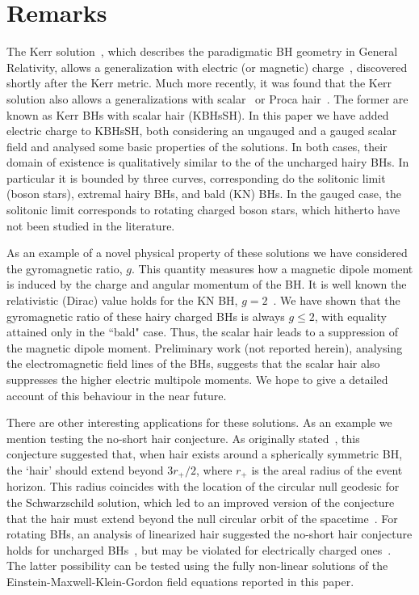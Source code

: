 \documentclass{article}
\begin{document}
\section{Remarks}
\label{sec_remarks}

The Kerr solution~\cite{Kerr:1963ud}, which describes the paradigmatic BH geometry in General Relativity, allows a generalization with electric (or magnetic) charge~\cite{Newman:1965my}, discovered shortly after the Kerr metric. Much more recently, it was found that the Kerr solution also allows a generalizations with scalar~\cite{Herdeiro:2014goa,Herdeiro:2015gia,Kleihaus:2015iea,Herdeiro:2015tia,Chodosh:2015oma} or Proca hair~\cite{Herdeiro:2016tmi}. The former are known as Kerr BHs with scalar hair (KBHsSH). In this paper we have added electric charge to KBHsSH, both considering an ungauged and a gauged scalar field and analysed some basic properties of the solutions. In both cases, their domain of existence is qualitatively similar to the of the uncharged hairy BHs. In particular it is bounded by three curves, corresponding do the solitonic limit (boson stars), extremal hairy BHs, and bald (KN) BHs. In the gauged case, the solitonic limit corresponds to rotating charged boson stars, which hitherto have not been studied in the literature. 

As an example of a novel physical property of these solutions we have considered the gyromagnetic ratio, $g$. This quantity measures how a magnetic dipole moment is induced by the charge and angular momentum of the BH. It is well known the relativistic (Dirac) value holds for the KN BH, $g=2$~\cite{Carter:1968rr}. We have shown that the gyromagnetic ratio of these hairy charged BHs is always $g\leqslant 2$, with equality attained only in the ``bald" case. Thus, the scalar hair leads to a suppression of the magnetic dipole moment. Preliminary work (not reported herein), analysing the electromagnetic field lines of the BHs, suggests that the scalar hair also suppresses the higher electric multipole moments. We hope to give a detailed account of this behaviour in the near future.




There are other interesting applications for these solutions. As an example we mention testing the no-short hair conjecture. As originally stated~\cite{Nunez:1996xv}, this conjecture suggested that, when hair exists around a spherically symmetric BH, the `hair' should extend
beyond $3r_+/2$, where $r_+$ is the areal radius of the event horizon. This radius coincides with the location of the
circular null geodesic for the Schwarzschild solution, which led to an improved version of the conjecture that the hair must extend beyond the null circular orbit of the spacetime~\cite{Hod:2011aa}. For rotating BHs, an analysis of linearized hair suggested the no-short hair conjecture holds for uncharged BHs~\cite{Hod:2016dkn}, but may be violated for electrically charged ones~\cite{Hod:2014sha,Hod:2015ynd}. The latter possibility can be tested using the fully non-linear solutions of the Einstein-Maxwell-Klein-Gordon field equations reported in this paper. 
\end{document}
